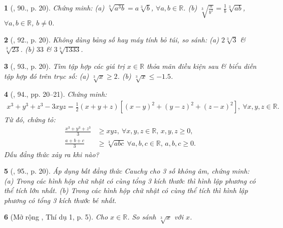 \documentclass{article}
\newtheorem{baitoan}{}
\begin{document}
\begin{baitoan}[\cite{SBT_Toan_9_tap_1}, 90., p. 20]
	Chứng minh: (a) $\sqrt[3]{a^3b} = a\sqrt[3]{b}$, $\forall a,b\in\mathbb{R}$. (b) $\sqrt[3]{\frac{a}{b^2}} = \frac{1}{b}\sqrt[3]{ab}$, $\forall a,b\in\mathbb{R}$, $b\ne0$.
\end{baitoan}

\begin{baitoan}[\cite{SBT_Toan_9_tap_1}, 92., p. 20]
	Không dùng bảng số hay máy tính bỏ túi, so sánh: (a) $2\sqrt[3]{3}$ \& $\sqrt[3]{23}$. (b) $33$ \& $3\sqrt[3]{1333}$.
\end{baitoan}

\begin{baitoan}[\cite{SBT_Toan_9_tap_1}, 93., p. 20]
	Tìm tập hợp các giá trị $x\in\mathbb{R}$ thỏa mãn điều kiện sau \& biểu diễn tập hợp đó trên trục số: (a) $\sqrt[3]{x}\ge2$. (b) $\sqrt[3]{x}\le-1.5$.
\end{baitoan}

\begin{baitoan}[\cite{SBT_Toan_9_tap_1}, 94., pp. 20--21]
	Chứng minh:
	\begin{align*}
		x^3 + y^3 + z^3 - 3xyz = \frac{1}{2}(x + y + z)\left[(x - y)^2 + (y - z)^2 + (z - x)^2\right],\ \forall x,y,z\in\mathbb{R}.
	\end{align*}
	Từ đó, chứng tỏ:
	\begin{align*}
		\frac{x^3 + y^3 + z^3}{3}&\ge xyz,\ \forall x,y,z\in\mathbb{R},\,x,y,z\ge0,\\
		\frac{a + b + c}{3}&\ge\sqrt[3]{abc}\ \forall a,b,c\in\mathbb{R},\,a,b,c\ge0.
	\end{align*}
	Dấu đẳng thức xảy ra khi nào?
\end{baitoan}

\begin{baitoan}[\cite{SBT_Toan_9_tap_1}, 95., p. 20]
	Áp dụng bất đẳng thức Cauchy cho 3 số không âm, chứng minh: (a) Trong các hình hộp chữ nhật có cùng tổng 3 kích thước thì hình lập phương có thể tích lớn nhất. (b) Trong các hình hộp chữ nhật có cùng thể tích thì hình lập phương có tổng 3 kích thước bé nhất.
\end{baitoan}

\begin{baitoan}[Mở rộng \cite{Tuyen_Toan_9_old}, Thí dụ 1, p. 5]
	Cho $x\in\mathbb{R}$. So sánh $\sqrt[3]{x}$ với $x$.
\end{baitoan}
\end{document}
